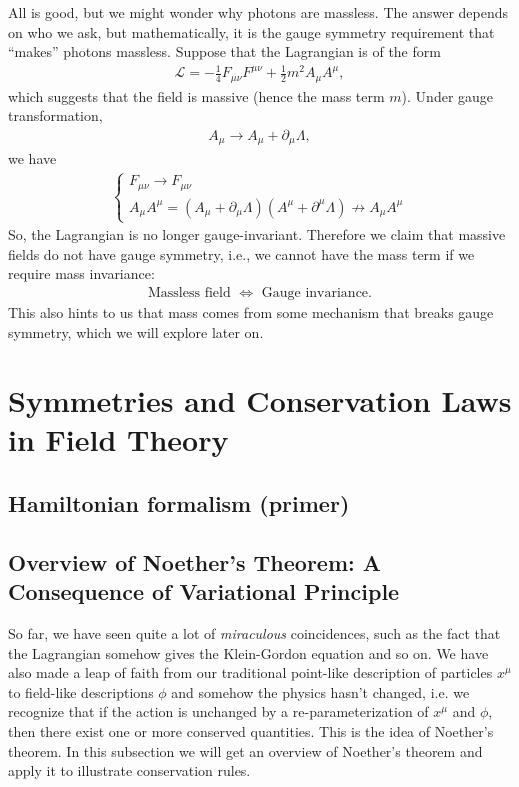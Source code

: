 \documentclass[a4paper,11pt]{article}
\numberwithin{equation}{section}
\theoremstyle{definition}
\newcommand{\p}{\partial}
\newcommand{\lag}{\mathcal{L}}
\begin{document}
All is good, but we might wonder why photons are massless. The answer depends on who we ask, but mathematically, it is the gauge symmetry requirement that ``makes'' photons massless. Suppose that the Lagrangian is of the form
\begin{align}
\lag = -\frac{1}{4}F_{\mu\nu}F^{\mu\nu}+ \frac{1}{2}m^2A_\mu A^\mu,
\end{align}
which suggests that the field is massive (hence the mass term $m$). Under gauge transformation,
\begin{align}
A_\mu \rightarrow A_\mu + \p_\mu \Lambda,
\end{align}
we have 
\begin{align}
\begin{cases}
F_{\mu\nu} \rightarrow F_{\mu\nu}\\
A_\mu A^\mu = (A_\mu + \p_\mu\Lambda)(A^\mu + \p^\mu\Lambda) \not\to A_\mu A^\mu
\end{cases}
\end{align}
So, the Lagrangian is no longer gauge-invariant. Therefore we claim that massive fields do not have gauge symmetry, i.e., we cannot have the mass term if we require mass invariance:
\begin{align}
\text{Massless field }\iff \text{ Gauge invariance}.
\end{align}
This also hints to us that mass comes from some mechanism that breaks gauge symmetry, which we will explore later on. 

\newpage

\section{Symmetries and Conservation Laws in Field Theory}

\subsection{Hamiltonian formalism (primer)}

\subsection{Overview of Noether's Theorem: A Consequence of Variational Principle}
So far, we have seen quite a lot of \textit{miraculous} coincidences, such as the fact that the Lagrangian somehow gives the Klein-Gordon equation and so on. We have also made a leap of faith from our traditional point-like description of particles $x^\mu$ to field-like descriptions $\phi$ and somehow the physics hasn't changed, i.e. we recognize that if the action is unchanged by a re-parameterization of $x^\mu$ and $\phi$, then there exist one or more conserved quantities. This is the idea of Noether's theorem. In this subsection we will get an overview of Noether's theorem and apply it to illustrate conservation rules.\\
\end{document}
